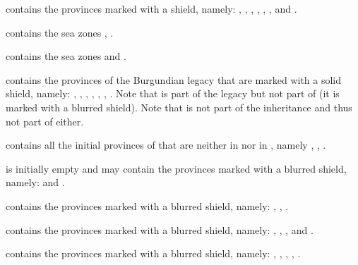 \begin{deflist}
\item[\anchorregion{Balkans}] contains the provinces marked with a
   shield, namely: ,
  , , ,
  , ,  and
  . %
\item[\anchorregion{Baltique}] contains the sea zones ,
  . %
\item[\anchorregion{Noire}] contains the sea zones  and
  .
\item[\anchorregion{Belgique}] contains the provinces of the Burgundian legacy
  that are marked with a solid  shield, namely:
  , , ,
  , , ,
  . %
  Note that  is part of the legacy but not part of
  \regionBelgique (it is marked with a blurred shield). Note that
  \provinceLiege is not part of the inheritance and thus not part of
  \regionBelgique either.
\item[\anchorregion{Denmark}] contains all the initial provinces of
   that are neither in  nor in ,
  namely , , .
\item[\anchorregion{Duche de Kurland}] is initially empty and may contain the
  provinces marked with a blurred  shield, namely:
   and .
\item[\anchorregion{Duche de Prusse}] contains the provinces marked with a
  blurred  shield, namely: ,
  , .
\item[\anchorregion{Finlande}] contains the provinces marked with a blurred
   shield, namely: ,
  , ,  and
  .
\item[\anchorregion{Irlande}] contains the provinces marked with a blurred
   shield, namely: ,
  , , ,
  .

\end{deflist}
